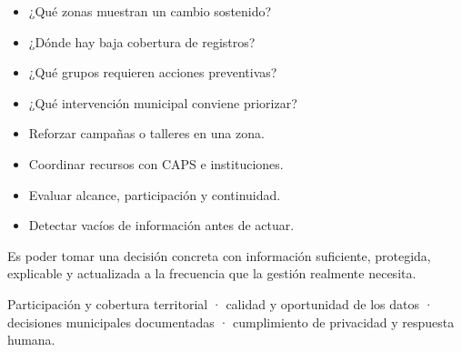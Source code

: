 \documentclass[11pt,a4paper]{article}
\begin{document}
\vspace{3mm}
\begin{minipage}[t]{.48\textwidth}
  \begin{softcard}[height=59mm]
    \begin{itemize}
      \item ¿Qué zonas muestran un cambio sostenido?
      \item ¿Dónde hay baja cobertura de registros?
      \item ¿Qué grupos requieren acciones preventivas?
      \item ¿Qué intervención municipal conviene priorizar?
    \end{itemize}
  \end{softcard}
\end{minipage}\hfill
\begin{minipage}[t]{.48\textwidth}
  \begin{softcard}[height=59mm]
    \begin{itemize}
      \item Reforzar campañas o talleres en una zona.
      \item Coordinar recursos con CAPS e instituciones.
      \item Evaluar alcance, participación y continuidad.
      \item Detectar vacíos de información antes de actuar.
    \end{itemize}
  \end{softcard}
\end{minipage}

\vspace{5mm}
\begin{terracard}
  Es poder tomar una decisión concreta con información suficiente, protegida, explicable y actualizada a la frecuencia que la gestión realmente necesita.
\end{terracard}

\vspace{4mm}
\begin{softcard}
  Participación y cobertura territorial · calidad y oportunidad de los datos · decisiones municipales documentadas · cumplimiento de privacidad y respuesta humana.
\end{softcard}

\clearpage
\end{document}
